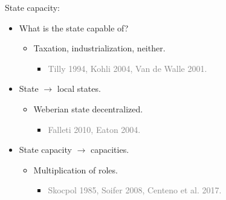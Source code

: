 \documentclass[ignorenonframetext,]{beamer}
\providecommand{\tightlist}{%
  \setlength{\itemsep}{0pt}\setlength{\parskip}{0pt}}
\begin{document}
\begin{frame}{State capacity:}

\begin{itemize}[<+->]
\tightlist
\item
  What is the state capable of?

  \begin{itemize}[<+->]
  \tightlist
  \item
    Taxation, industrialization, neither.

    \begin{itemize}[<+->]
    \tightlist
    \item
      \textcolor{gray}{Tilly 1994, Kohli 2004, Van de Walle 2001.}
    \end{itemize}
  \end{itemize}
\item
  State \(\rightarrow\) local states.

  \begin{itemize}[<+->]
  \tightlist
  \item
    Weberian state decentralized.

    \begin{itemize}[<+->]
    \tightlist
    \item
      \textcolor{gray}{Falleti 2010, Eaton 2004.}
    \end{itemize}
  \end{itemize}
\item
  State capacity \(\rightarrow\) capacities.

  \begin{itemize}[<+->]
  \tightlist
  \item
    Multiplication of roles.

    \begin{itemize}[<+->]
    \tightlist
    \item
      \textcolor{gray}{Skocpol 1985, Soifer 2008, Centeno et al. 2017.}
    \end{itemize}
  \end{itemize}
\end{itemize}

\end{frame}
\end{document}
